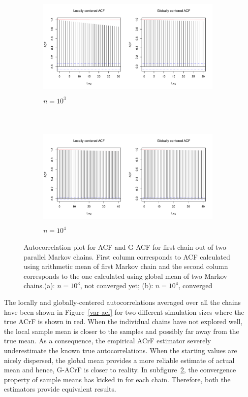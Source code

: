 \documentclass[11pt]{article}
\theoremstyle{remark}
\begin{document}
\begin{figure}[h]
 \begin{subfigure}[h]{\textwidth}
   \centering
   \includegraphics[width=.7\linewidth, height = 2in]{plots/var-acf_n1000.pdf}
   \caption{$n = 10^3$}
   \label{subfig:var-acf_n1e3}
\end{subfigure}\\
\begin{subfigure}[h]{\textwidth}
  \centering
  \includegraphics[width=.7\linewidth, height = 2in]{plots/var-acf_n10000.pdf} 
  \caption{$n = 10^4$}
  \label{subfig:var-acf_n1e5}
\end{subfigure}

\caption{Autocorrelation plot for ACF and G-ACF for first chain out of two parallel Markov chains. First column corresponds to ACF calculated using arithmetic mean of first Markov chain and the second column corresponds to the one calculated using global mean of two Markov chains.(a): $n = 10^3$, not converged yet; (b): $n =  10^4$, converged}
\label{fig:var-acf}
\end{figure}

The locally and globally-centered autocorrelations averaged over all the chains have been shown in Figure~\ref{var-acf} for two different simulation sizes where the true ACrF is shown in red. When the individual chains have not explored well, the local sample mean is closer to the samples and possibly far away from the true mean. As a consequence, the empirical ACrF estimator severely underestimate the known true autocorrelations. When the starting values are nicely dispersed, the global mean provides a more reliable estimate of actual mean and hence, G-ACrF is closer to reality. In subfigure~\ref{subfig:var-acf_n1e5}, the convergence property of sample means has kicked in for each chain. Therefore, both the estimators provide equivalent results. \\
\end{document}
